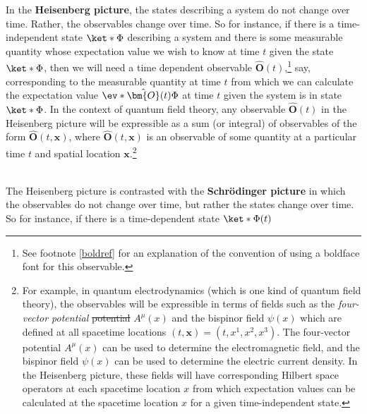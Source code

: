 \documentclass[12pt]{report}
\providecommand{\DIFdel}[1]{{\protect\color{red}\sout{#1}}}                      %
\providecommand{\DIFdelbegin}{} %
\providecommand{\DIFdelend}{} %
\begin{document}
In the \textbf{Heisenberg picture}, the states describing a system do not change over time. Rather, the observables change over time. So for instance, if there is a time-independent state $\ket*{\Phi}$ describing a system and there is some measurable quantity whose expectation value we wish to know at time $t$ given the state $\ket*{\Phi}$, %
%
 then we will need a time dependent observable $\hat{\bm{O}}(t)$,\footnote{See footnote \ref{boldref} for an explanation of the convention of using a boldface font for this observable.} say, corresponding to the measurable quantity at time $t$ from which we can calculate the expectation value $\ev*{\hat{\bm{O}}(t)}{\Phi}$ at time $t$  given the system is in state $\ket*{\Phi}$. In the context of quantum field theory, any observable $\hat{\bm{O}}(t)$ %
  in the Heisenberg picture will be expressible as a sum (or integral) of observables of the form $\hat{\bm{O}}(t, \bm{x})$, where $\hat{\bm{O}}(t, \bm{x})$ %
   is an observable of some quantity at a particular time $t$ and spatial location $\bm{x}$.\footnote{For example, in quantum electrodynamics (which is one kind of quantum field theory), the observables will be expressible in terms of fields such as the \emph{four-vector potential}  \DIFdelbegin \DIFdel{potential }\DIFdelend $A^\mu(x)$  %
   and the bispinor field $\psi(x)$ %
    which are defined at all spacetime locations $(t, \bm{x})=(t, x^1, x^2, x^3)$. The four-vector potential $A^\mu(x)$ can be used to determine the electromagnetic field, and the bispinor field $\psi(x)$ can be used to determine the electric current density. In the Heisenberg picture, these fields will have corresponding Hilbert space operators at each spacetime location $x$ from which expectation values can be calculated at the spacetime location $x$ for a given time-independent state.}
\strut \\[\baselineskip]
The Heisenberg picture is contrasted with the \textbf{Schr\"{o}dinger picture} in which the observables do not change over time, but rather the states change over time. So for instance, if there is a time-dependent state $\ket*{\Phi(t)}$  %
\end{document}
